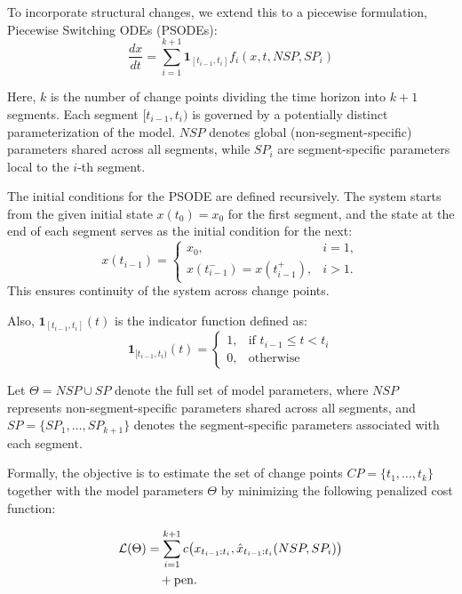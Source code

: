 \documentclass[10pt,letterpaper]{article}
\begin{document}
To incorporate structural changes, we extend this to a piecewise formulation, Piecewise Switching ODEs (PSODEs):
\begin{equation}
\frac{dx}{dt} = \sum_{i=1}^{k+1} \mathbf{1}_{[t_{i-1}, t_i]} f_i(x, t, NSP, SP_i)
\end{equation}

Here, \( k \) is the number of change points dividing the time horizon into \( k+1 \) segments. Each segment \( [t_{i-1}, t_i) \) is governed by a potentially distinct parameterization of the model. \( NSP \) denotes global (non-segment-specific) parameters shared across all segments, while \( SP_i \) are segment-specific parameters local to the \( i \)-th segment. 

The initial conditions for the PSODE are defined recursively. The system starts from the given initial state \( x(t_0) = x_0 \) for the first segment, and the state at the end of each segment serves as the initial condition for the next:
\begin{equation}
x(t_{i-1}) =
\begin{cases}
x_0, & i = 1, \\
x(t_{i-1}^-) = x(t_{i-1}^+), & i > 1.
\end{cases}
\end{equation}
This ensures continuity of the system across change points.

Also, \( \mathbf{1}_{[t_{i-1}, t_i]}(t) \) is the indicator function defined as:
\begin{equation}
\mathbf{1}_{[t_{i-1}, t_i)}(t) = 
\begin{cases}
1, & \text{if } t_{i-1} \leq t < t_i \\
0, & \text{otherwise}
\end{cases}
\end{equation}

Let \(\Theta = NSP \cup SP\) denote the full set of model parameters,
where \(NSP\) represents non-segment-specific parameters shared across
all segments, and \(SP = \{SP_1, \dots, SP_{k+1}\}\) denotes the
segment-specific parameters associated with each segment.

Formally, the objective is to estimate the set of change points
\( CP = \{ t_1, \dots, t_k \} \) together with the model parameters
\(\Theta\) by minimizing the following penalized cost function:

\begin{align}
\label{eq:objective}
\mathcal{L}(\Theta)
&=
\sum_{i=1}^{k+1}
c\!\left(
x_{t_{i-1}:t_i},
\hat{x}_{t_{i-1}:t_i}(NSP, SP_i)
\right)
\notag \nonumber \\
&\quad
+ \mathrm{pen}.
\end{align}
\end{document}
